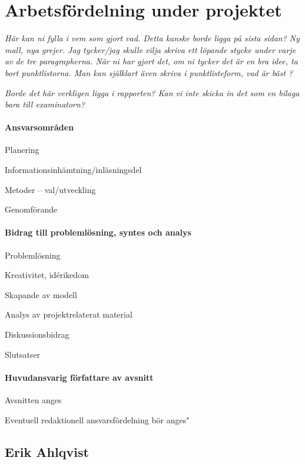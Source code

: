 \documentclass[12pt,a4paper]{article}
\begin{document}

\section*{Arbetsfördelning under projektet}

\emph{\color{red}Här kan ni fylla i vem som gjort vad. Detta kanske borde ligga på sista sidan?}
\emph{\color{red}Ny mall, nya grejer. Jag tycker/jag skulle vilja skriva ett löpande stycke under varje av de tre paragrapherna. När ni har gjort det, om ni tycker det är en bra idee, ta bort punktlistorna. Man kan själklart även skriva i punktlisteform, vad är bäst ?}

\emph{\color{blue} Borde det här verkligen ligga i rapporten? Kan vi inte skicka in det som en bilaga bara till examinatorn?}

\paragraph{Ansvarsområden}

       Planering

       Informationsinhämtning/inläsningsdel

       Metoder -- val/utveckling 

       Genomförande 

\paragraph{Bidrag till problemlösning, syntes och analys}

       Problemlösning 

       Kreativitet, idérikedom

       Skapande av modell

       Analys av projektrelaterat material 

       Diskussionsbidrag

       Slutsatser 

\paragraph{Huvudansvarig författare av avsnitt}

       Avsnitten anges

       Eventuell redaktionell ansvarsfördelning bör anges"



\subsection*{Erik Ahlqvist}
\end{document}
